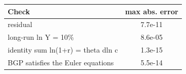 \begin{tabular}{lc}\toprule Check & max abs. error\\\midrule
residual & 7.7e-11\\
long-run ln Y = 10\% & 8.6e-05\\
identity sum ln(1+r) = theta dln c & 1.3e-15\\
BGP satisfies the Euler equations & 5.5e-14\\
\bottomrule\end{tabular}
